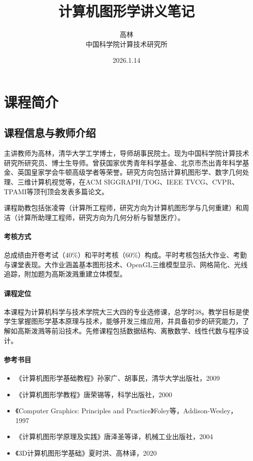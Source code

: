 \documentclass[12pt]{article}
\title{计算机图形学讲义笔记}
\author{高林 \\ 中国科学院计算技术研究所}
\date{2026.1.14}
\begin{document}
\maketitle

\tableofcontents

\newpage

\section{课程简介}

\subsection{课程信息与教师介绍}

主讲教师为高林，清华大学工学博士，导师胡事民院士。现为中国科学院计算技术研究所研究员、博士生导师。曾获国家优秀青年科学基金、北京市杰出青年科学基金、英国皇家学会牛顿高级学者等荣誉。研究方向包括计算机图形学、数字几何处理、三维计算机视觉等，在ACM SIGGRAPH/TOG、IEEE TVCG、CVPR、TPAMI等顶刊顶会发表多篇论文。

课程助教包括张凌霄（计算所工程师，研究方向为计算机图形学与几何重建）和周洁（计算所助理工程师，研究方向为几何分析与智慧医疗）。

\paragraph{考核方式}
总成绩由开卷考试（40\%）和平时考核（60\%）构成。平时考核包括大作业、考勤与课堂表现。大作业涵盖基本图形技术、OpenGL三维模型显示、网格简化、光线追踪，附加题为高斯泼溅重建立体模型。

\paragraph{课程定位}
本课程为计算机科学与技术学院大三大四的专业选修课，总学时38。教学目标是使学生掌握图形学基本原理与技术，能够开发三维应用，并具备初步的研究能力，了解如高斯泼溅等前沿技术。先修课程包括数据结构、离散数学、线性代数与程序设计。

\paragraph{参考书目}
\begin{itemize}
    \item 《计算机图形学基础教程》孙家广、胡事民，清华大学出版社，2009
    \item 《计算机图形学教程》唐荣锡等，科学出版社，2000
    \item 《Computer Graphics: Principles and Practice》Foley等，Addison-Wesley，1997
    \item 《计算机图形学原理及实践》唐泽圣等译，机械工业出版社，2004
    \item 《3D计算机图形学基础》夏时洪、高林译，2020
\end{itemize}
\end{document}
